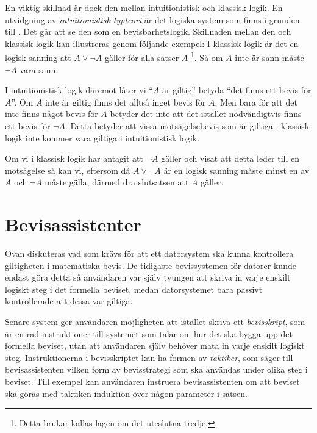 En viktig skillnad är dock den mellan intuitionistisk och klassisk logik. En
utvidgning av \emph{intuitionistisk typteori}\cite{martin1984intuitionistic} är
det logiska system som finns i grunden till \coq{}\cite{bertot2004interactive}.
Det går att se den som en bevisbarhetslogik. Skillnaden mellan den och klassisk
logik kan illustreras genom följande exempel: I klassisk logik är det en logisk
sanning att $A \lor \neg A$ gäller för alla satser $A$ \footnote{Detta brukar
kallas lagen om det uteslutna tredje.}. Så om $A$ inte är sann måste $\neg A$
vara sann\cite{bennet2004forsta}.

I intuitionistisk logik däremot låter vi ``$A$ är giltig'' betyda ``det finns
ett bevis för $A$''. Om $A$ inte är giltig finns det alltså inget bevis för
$A$. Men bara för att det inte finns något bevis för $A$ betyder det inte att
det istället nödvändigtvis finns ett bevis för $\neg A$. Detta betyder att
vissa motsägelsebevis som är giltiga i klassisk logik inte kommer vara giltiga
i intuitionistisk logik\cite{barendregt2001proofdependent}.

Om vi i klassisk logik har antagit att $\neg A$ gäller och visat att detta
leder till en motsägelse så kan vi, eftersom då $A \lor \neg A$ är en logisk
sanning måste minst en av $A$ och $\neg A$ måste gälla, därmed dra slutsatsen
att $A$ gäller.

\section{Bevisassistenter}
Ovan diskuteras vad som krävs för att ett datorsystem ska kunna kontrollera
giltigheten i matematiska bevis. De tidigaste bevissystemen för datorer kunde
endast göra detta så användaren var själv tvungen att skriva in varje enskilt
logiskt steg i det formella beviset, medan datorsystemet bara passivt
kontrollerade att dessa var giltiga.

Senare system ger användaren möjligheten att istället skriva ett
\emph{bevisskript}, som är en rad instruktioner till systemet som talar om hur
det ska bygga upp det formella beviset, utan att användaren själv behöver mata
in varje enskilt logiskt steg.
Instruktionerna i bevisskriptet kan ha formen av \emph{taktiker}, som säger till
bevisassistenten vilken form av bevisstrategi som ska användas under olika steg
i beviset. Till exempel kan användaren instruera bevisassistenten om att
beviset ska göras med taktiken induktion över någon parameter i satsen.

